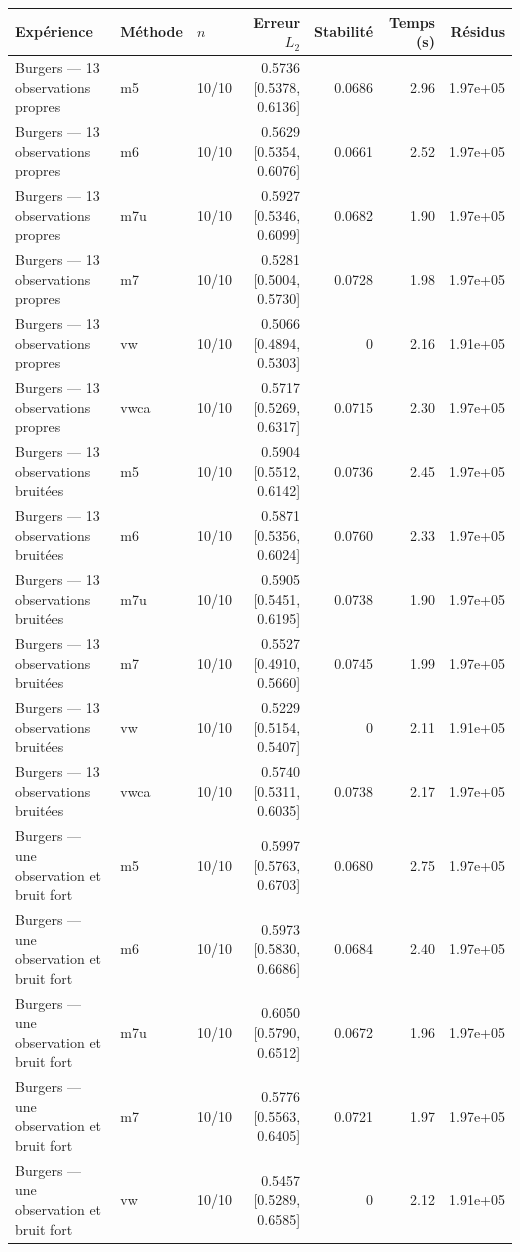 \begin{tabular}{lllrrrr}
\toprule
Expérience & Méthode & $n$ & Erreur $L_2$ & Stabilité & Temps (s) & Résidus \\
\midrule
Burgers — 13 observations propres & m5 & 10/10 & 0.5736 [0.5378, 0.6136] & 0.0686 & 2.96 & 1.97e+05 \\
Burgers — 13 observations propres & m6 & 10/10 & 0.5629 [0.5354, 0.6076] & 0.0661 & 2.52 & 1.97e+05 \\
Burgers — 13 observations propres & m7u & 10/10 & 0.5927 [0.5346, 0.6099] & 0.0682 & 1.90 & 1.97e+05 \\
Burgers — 13 observations propres & m7 & 10/10 & 0.5281 [0.5004, 0.5730] & 0.0728 & 1.98 & 1.97e+05 \\
Burgers — 13 observations propres & vw & 10/10 & 0.5066 [0.4894, 0.5303] & 0 & 2.16 & 1.91e+05 \\
Burgers — 13 observations propres & vwca & 10/10 & 0.5717 [0.5269, 0.6317] & 0.0715 & 2.30 & 1.97e+05 \\
Burgers — 13 observations bruitées & m5 & 10/10 & 0.5904 [0.5512, 0.6142] & 0.0736 & 2.45 & 1.97e+05 \\
Burgers — 13 observations bruitées & m6 & 10/10 & 0.5871 [0.5356, 0.6024] & 0.0760 & 2.33 & 1.97e+05 \\
Burgers — 13 observations bruitées & m7u & 10/10 & 0.5905 [0.5451, 0.6195] & 0.0738 & 1.90 & 1.97e+05 \\
Burgers — 13 observations bruitées & m7 & 10/10 & 0.5527 [0.4910, 0.5660] & 0.0745 & 1.99 & 1.97e+05 \\
Burgers — 13 observations bruitées & vw & 10/10 & 0.5229 [0.5154, 0.5407] & 0 & 2.11 & 1.91e+05 \\
Burgers — 13 observations bruitées & vwca & 10/10 & 0.5740 [0.5311, 0.6035] & 0.0738 & 2.17 & 1.97e+05 \\
Burgers — une observation et bruit fort & m5 & 10/10 & 0.5997 [0.5763, 0.6703] & 0.0680 & 2.75 & 1.97e+05 \\
Burgers — une observation et bruit fort & m6 & 10/10 & 0.5973 [0.5830, 0.6686] & 0.0684 & 2.40 & 1.97e+05 \\
Burgers — une observation et bruit fort & m7u & 10/10 & 0.6050 [0.5790, 0.6512] & 0.0672 & 1.96 & 1.97e+05 \\
Burgers — une observation et bruit fort & m7 & 10/10 & 0.5776 [0.5563, 0.6405] & 0.0721 & 1.97 & 1.97e+05 \\
Burgers — une observation et bruit fort & vw & 10/10 & 0.5457 [0.5289, 0.6585] & 0 & 2.12 & 1.91e+05 \\

\end{tabular}
